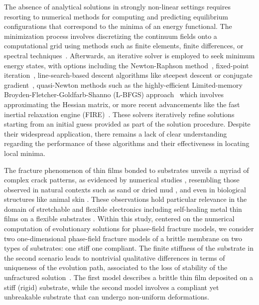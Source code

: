 The absence of analytical solutions in strongly non-linear settings requires resorting to numerical methods for computing and predicting equilibrium configurations that correspond to the minima of an energy functional. The minimization process involves discretizing the continuum fields onto a computational grid using methods such as finite elements, finite differences, or spectral techniques~\cite{Salman2009-qv,Liu2013-sj,Hu2021-mq}. Afterwards, an iterative solver is employed to seek minimum energy states, with options including the Newton-Raphson method~\cite{Wick2017-bo}, fixed-point iteration~\cite{Chen2019-mn,Kirkesaether_Brun2020-wa,Storvik2021-cd}, line-search-based descent algorithms like steepest descent or conjugate gradient~\cite{Stiefel1952-fw,Dai1999-hz}, quasi-Newton methods such as the highly-efficient Limited-memory Broyden-Fletcher-Goldfarb-Shanno (\textsc{L-BFGS}) approach~\cite{Liu1989-kl} which involves approximating the Hessian matrix, or more recent advancements like the fast inertial relaxation engine (\textsc{FIRE})~\cite{Guenole2020-tc}. These solvers iteratively refine solutions starting from an initial guess provided as part of the solution procedure. Despite their widespread application, there remains a lack of clear understanding regarding the performance of these algorithms and their effectiveness in locating local minima. 


The fracture phenomenon of thin films bonded to substrates unveils a myriad of complex crack patterns, as evidenced by numerical studies \cite{Baldelli2014-ho,Alessi2019-bx,Hu2020-nt,Salman2021-mn,Baldelli2021-gc}, resembling those observed in natural contexts such as sand or dried mud \cite{Goehring2010-xz}, and even in biological structures like animal skin \cite{Qin2014-wz}. These observations hold particular relevance in the domain of stretchable and flexible electronics \cite{Faurie2019-to,Godard2022-ss} including  self-healing metal thin films on a flexible substrates \cite{Trost2024-ca}. 
Within this study, centered on the numerical computation of evolutionary solutions for phase-field fracture models, we consider two one-dimensional phase-field fracture models of a brittle membrane on two types of substrates: one stiff one compliant. The finite stiffness of the substrate in the second scenario leads to nontrivial qualitative differences in terms of uniqueness of the evolution path, associated to the loss of stability of the unfractured solution~\cite{Baldelli2014-ho,Kuhn2015-rt,Baldelli2021-gc,Harandi2023-cd}.
The first model describes a brittle thin film deposited on a stiff (rigid) substrate, while the second model involves a compliant yet unbreakable substrate that can undergo non-uniform deformations. 

